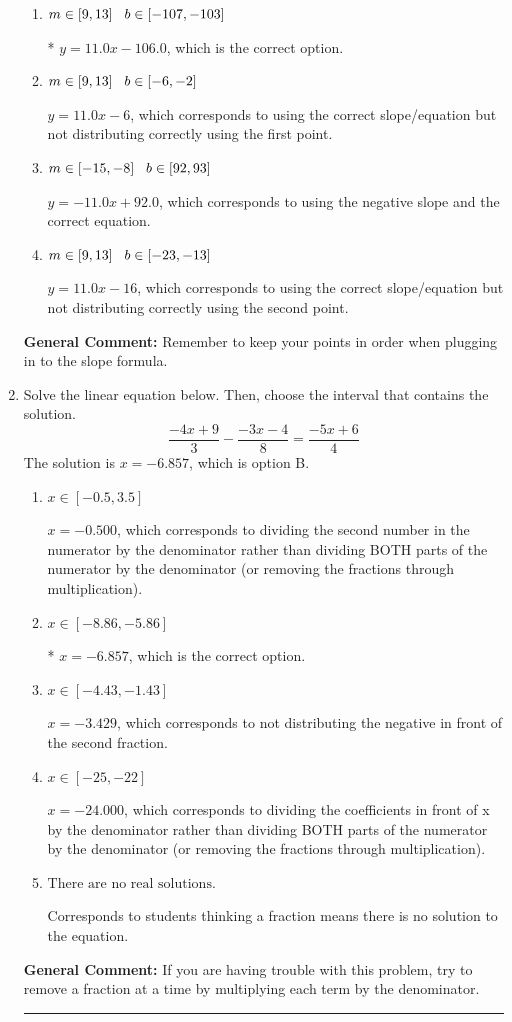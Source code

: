 \documentclass{extbook}[14pt]
\newcommand{\litem}[1]{\item #1

\rule{\textwidth}{0.4pt}}
\begin{document}
\begin{enumerate}
{\begin{enumerate}[label=\Alph*.]
 $y = 11.0x + 106.0$, which corresponds to using the correct slope and getting the negative y-intercept.
\item \( m \in [9, 13] \hspace*{3mm} b \in [-107, -103] \)

* $y = 11.0x -106.0$, which is the correct option.
\item \( m \in [9, 13] \hspace*{3mm} b \in [-6, -2] \)

 $y = 11.0x -6$, which corresponds to using the correct slope/equation but not distributing correctly using the first point.
\item \( m \in [-15, -8] \hspace*{3mm} b \in [92, 93] \)

 $y = -11.0x + 92.0$, which corresponds to using the negative slope and the correct equation.
\item \( m \in [9, 13] \hspace*{3mm} b \in [-23, -13] \)

 $y = 11.0x -16$, which corresponds to using the correct slope/equation but not distributing correctly using the second point.
\end{enumerate}

\textbf{General Comment:} Remember to keep your points in order when plugging in to the slope formula.
}
\litem{
Solve the linear equation below. Then, choose the interval that contains the solution.
\[ \frac{-4x + 9}{3} - \frac{-3x -4}{8} = \frac{-5x + 6}{4} \]The solution is \( x = -6.857 \), which is option B.\begin{enumerate}[label=\Alph*.]
\item \( x \in [-0.5, 3.5] \)

 $x = -0.500$, which corresponds to dividing the second number in the numerator by the denominator rather than dividing BOTH parts of the numerator by the denominator (or removing the fractions through multiplication).
\item \( x \in [-8.86, -5.86] \)

* $x = -6.857$, which is the correct option.
\item \( x \in [-4.43, -1.43] \)

 $x = -3.429$, which corresponds to not distributing the negative in front of the second fraction.
\item \( x \in [-25, -22] \)

 $x = -24.000$, which corresponds to dividing the coefficients in front of x by the denominator rather than dividing BOTH parts of the numerator by the denominator (or removing the fractions through multiplication).
\item \( \text{There are no real solutions.} \)

Corresponds to students thinking a fraction means there is no solution to the equation.
\end{enumerate}

\textbf{General Comment:} If you are having trouble with this problem, try to remove a fraction at a time by multiplying each term by the denominator.
}
\end{enumerate}
\end{document}

